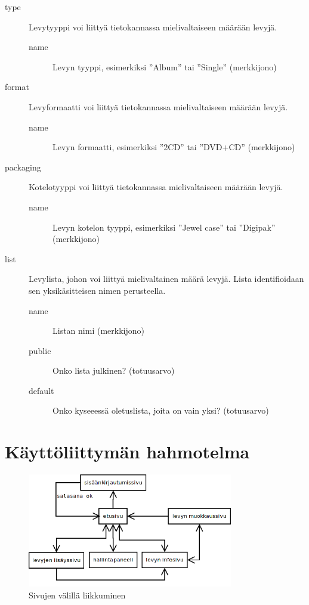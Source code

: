 \documentclass[a4paper,12pt]{report}
\begin{document}
\begin{description}
  \item[type]
    Levytyyppi voi liittyä tietokannassa mielivaltaiseen määrään levyjä.
    \begin{description}
      \item[name] Levyn tyyppi, esimerkiksi ''Album'' tai ''Single''
        (merkkijono)
    \end{description}

  \item[format]
    Levyformaatti voi liittyä tietokannassa mielivaltaiseen määrään levyjä.
    \begin{description}
      \item[name] Levyn formaatti, esimerkiksi ''2CD'' tai ''DVD+CD''
        (merkkijono)
    \end{description}

  \item[packaging]
    Kotelotyyppi voi liittyä tietokannassa mielivaltaiseen määrään levyjä.
    \begin{description}
      \item[name] Levyn kotelon tyyppi, esimerkiksi ''Jewel case'' tai
        ''Digipak'' (merkkijono)
    \end{description}

  \item[list]
    Levylista, johon voi liittyä mielivaltainen määrä levyjä.
    Lista identifioidaan sen yksikäsitteisen nimen perusteella.
    \begin{description}
      \item[name] Listan nimi (merkkijono)
      \item[public] Onko lista julkinen? (totuusarvo)
      \item[default] Onko kyseeessä oletuslista, joita on vain yksi?
        (totuusarvo)
    \end{description}

\end{description}

\section{Käyttöliittymän hahmotelma}

\begin{figure}[H]
  \begin{center}
    \includegraphics[width=0.8\textwidth]{diagrams/kalikaavio}
  \end{center}
  \caption{Sivujen välillä liikkuminen}
\end{figure}
\end{document}
